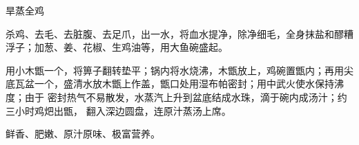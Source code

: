 %
%
%
%
%
%
%
\begin{recipe}{旱蒸全鸡}

\ingredients


\preparation

\step 杀鸡、去毛、去脏腹、去足爪，出一水，将血水提净，除净细毛，全身抹盐和醪糟
浮子；加葱、姜、花椒、生鸡油等，用大鱼碗盛起。

\step 用小木甑一个，将箅子翻转垫平；锅内将水烧沸，木甑放上，鸡碗置甑内；再用尖
底瓦盆一个，盛清水放木甑上作盖，甑口处用湿布帕密封；用中武火使水保持沸度；由于
密封热气不易散发，水蒸汽上升到盆底结成水珠，滴于碗内成汤汁；约三小时鸡𤆵出甑，
翻入深边圆盘，连原汁蒸汤上席。

\features

鲜香、肥嫩、原汁原味、极富营养。

\end{recipe}

